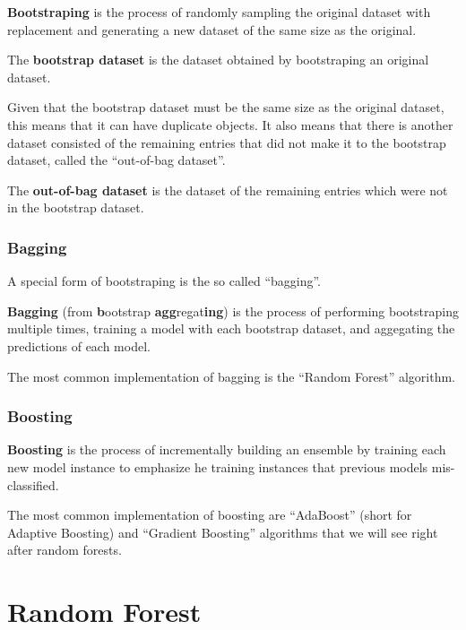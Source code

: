 \bd[Bootstraping]
\textbf{Bootstraping} is the process of randomly sampling the original dataset with replacement and generating a new
dataset of the same size as the original.
\ed

The \textbf{bootstrap dataset} is the dataset obtained by bootstraping an original dataset.
\ed

Given that the bootstrap dataset must be the same size as the original dataset, this means that it can have
duplicate objects. It also means that there is another dataset consisted of the remaining entries that did not
make it to the bootstrap dataset, called the ``out-of-bag dataset''.

The \textbf{out-of-bag dataset} is the dataset of the remaining entries which were not in the bootstrap dataset.
\ed


\subsubsection{Bagging}

A special form of bootstraping is the so called ``bagging''.

\bd[Bagging]
\textbf{Bagging} (from \textbf{b}ootstrap \textbf{agg}regat\textbf{ing}) is the process of performing bootstraping
multiple times, training a model with each bootstrap dataset, and aggegating the predictions of each model.
\ed


The most common implementation of bagging is the ``Random Forest'' algorithm.

\subsubsection{Boosting}

\bd[Boosting]
\textbf{Boosting} is the process of incrementally building an ensemble by training each new model instance to emphasize
he training instances that previous models mis-classified.
\ed


The most common implementation of boosting are ``AdaBoost'' (short for Adaptive  Boosting) and ``Gradient Boosting''
algorithms that we will see right after random forests.

\section{Random Forest}

